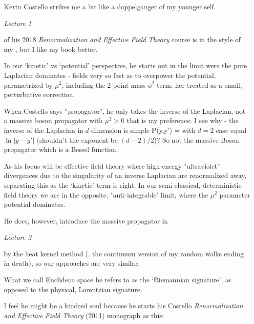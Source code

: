 \begin{description}
{Kevin Costello} strikes me a bit like a doppelganger of my
younger self.

 {\em Lecture 1}

of his 2018
{\em Renormalization and Effective Field Theory} course
is in the style of my , but I like my book better.

In our `kinetic' vs `potential' perspective, he starts out in the limit
were the pure Laplacian dominates  - fields very so fast as to overpower
the potential, parametrized by $\mu^2$, including the 2-point mass
$\phi^2$ term, her treated as a small, perturbative correction.

When Costello says "propagator", he only takes the inverse of the
Laplacian, not a massive boson propagator with $\mu^2>0$ that is my
preference. I see why - the inverse of the Laplacian in $d$ dimension is
simple
\beq
P(y,y') = 
with $d=2$ case equal $\ln|y-y'|$ (shouldn't the exponent be $(d-2)/2$)?
So not the massive Boson propagator which is a Bessel function.

As his focus will be effective field theory where high-energy "ultraviolet"
divergences due to the singularity of an inverse Laplacian are renormalized away, separating this
as the `kinetic' term is right.  In our semi-classical, deterministic field theory
we are in the opposite, "anti-integrable' limit, where the $\mu^2$
parameter potential dominates.

He does, however,  introduce the massive propagator in

  {\em Lecture 2}

by the heat kernel method (\ie, the continuum version of my random
walks ending in death), so our approaches are very similar.

What we call Euclidean space he refers to as the `Riemannian signature',
as opposed to
the physical, Lorentzian signature.

\bigskip

I feel he might be a kindred soul because he starts his
Costello {\em Renormalization and Effective Field Theory}
(2011) monograph as this:


\end{description}
